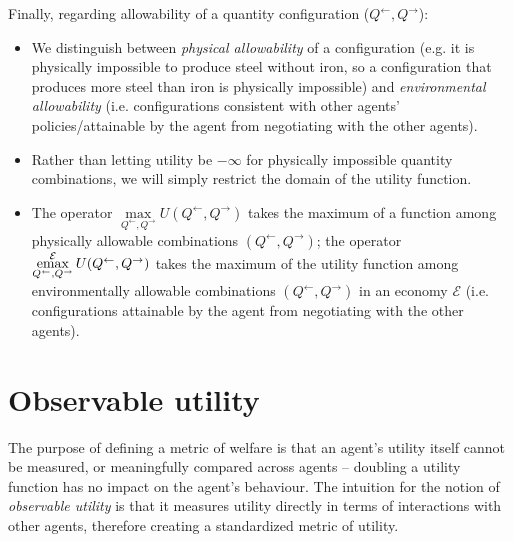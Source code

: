 \documentclass{journal}
\theoremstyle{plain}
\theoremstyle{definition}
\newcommand{\economy}{\ensuremath{\mathcal{E}}}
\newcommand{\emax}{\ensuremath{\operatornamewithlimits{emax}}}
\begin{document}
Finally, regarding allowability of a quantity configuration ($Q^\leftarrow, Q^\rightarrow$): 

\begin{itemize}
    \item We distinguish between \emph{physical allowability} of a configuration (e.g. it is physically impossible to produce steel without iron, so a configuration that produces more steel than iron is physically impossible) and \emph{environmental allowability} (i.e. configurations consistent with other agents' policies/attainable by the agent from negotiating with the other agents).
    \item Rather than letting utility be $-\infty$ for physically impossible quantity combinations, we will simply restrict the domain of the utility function. 
    \item The operator $\max\limits_{Q^\leftarrow, Q^\rightarrow} U(Q^\leftarrow, Q^\rightarrow)$ takes the maximum of a function among physically allowable combinations $(Q^\leftarrow, Q^\rightarrow)$; the operator $\emax\limits_{Q^\leftarrow, Q^\rightarrow}^\economy U(Q^\leftarrow, Q^\rightarrow)$ takes the maximum of the utility function among environmentally allowable combinations $(Q^\leftarrow, Q^\rightarrow)$ in an economy $\economy$ (i.e. configurations attainable by the agent from negotiating with the other agents).
\end{itemize} 

\section{Observable utility}
\label{sec:main}

The purpose of defining a metric of welfare is that an agent's utility itself cannot be measured, or meaningfully compared across agents -- doubling a utility function has no impact on the agent's behaviour. The intuition for the notion of \emph{observable utility} is that it measures utility directly in terms of interactions with other agents, therefore creating a standardized metric of utility.
\end{document}
